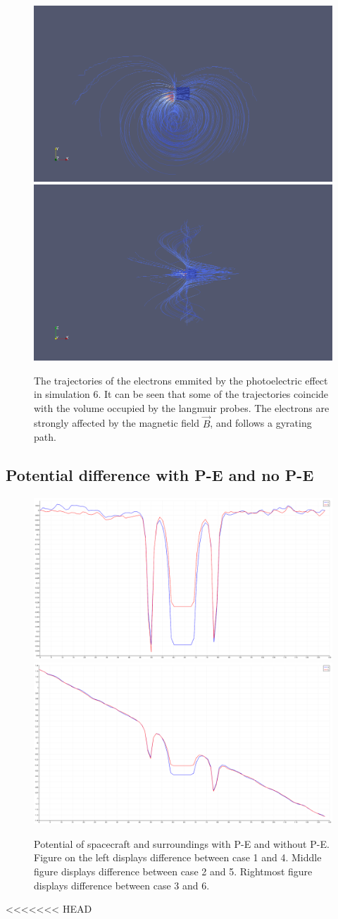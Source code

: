 	\begin{figure}
		\includegraphics[width = 0.49 \textwidth]{images/case6_jph_paths}
		\includegraphics[width = 0.49 \textwidth]{images/case6_jph_paths_2}
		\caption{The trajectories of the electrons emmited by the photoelectric effect in simulation \(6\). It can be seen that some
		of the trajectories coincide with the volume occupied by the langmuir probes. The electrons are strongly affected by the magnetic
		field \(\vec{B}\), and follows a gyrating path.}
 	\end{figure}


\subsection{Potential difference with P-E and no P-E}

    \begin{figure}
        \includegraphics[width = 0.3 \textwidth]{images/pot_case25.png}
        \includegraphics[width = 0.3 \textwidth]{images/pot_case36.png}
        \caption{Potential of spacecraft and surroundings with P-E and without P-E. Figure on the left displays difference between case 1 and 4. Middle figure displays difference between case 2 and 5. Rightmost figure displays difference between case 3 and 6.}
    \end{figure}
<<<<<<< HEAD


